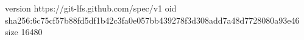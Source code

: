 version https://git-lfs.github.com/spec/v1
oid sha256:6c75cf57b88fd5df1b42c3fa0e057bb439278f3d308add7a48d7728080a93e46
size 16480
